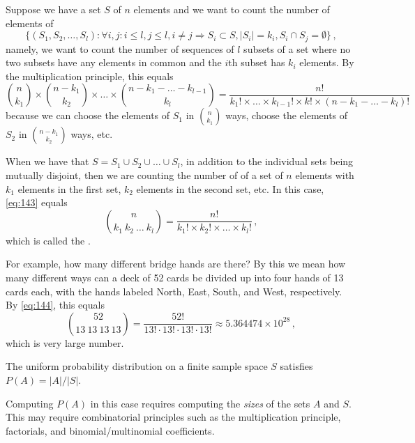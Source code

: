 \begin{example}
    Suppose we have a set $S$ of $n$ elements and we want to count the number of elements of
    \[
    \{(S_1, S_2,\dots,S_l): \forall i,j : i\leqslant l,j\leqslant l, i\neq j \Rightarrow S_i \subset S, |S_i|=k_i, S_i \cap S_j = \emptyset\}\,,
    \]
    namely, we want to count the number of sequences of $l$ subsets of a set where no two subsets have any elements in common and the $i$th subset has $k_i$ elements. By the multiplication principle, this equals
    \begin{equation}
        \label{eq:143}
        \binom{n}{k_1}\times\binom{n-k_1}{k_2}\times\dots\times\binom{n-k_1-\dots-k_{l-1}}{k_l} =        \frac{n!}{k_1!\times\dots\times k_{l-1}!\times k!\times(n-k_1-\dots-k_l)!}
    \end{equation}
    because we can choose the elements of $S_1$ in $\binom{n}{k_1}$ ways, choose the elements of $S_2$ in $\binom{n-k_1}{k_2}$ ways, etc.

    When we have that $S=S_1 \cup S_2 \cup \dots \cup S_l$, in addition to the individual sets being mutually disjoint, then we are counting the number of  of a set of $n$ elements with $k_1$ elements in the first set, $k_2$ elements in the second set, etc. In this case, \autoref{eq:143} equals
    \begin{equation}\label{eq:144}
        \binom{n}{k_1\:k_2\:\dots\:k_l} = \frac{n!}{k_1!\times k_2!\times\dots\times k_l!}\,,
    \end{equation}
    which is called the .
\end{example}

For example, how many different bridge hands are there? By this we mean how many different ways can a deck of 52 cards be divided up into four hands of 13 cards each, with the hands labeled North, East, South, and West, respectively. By  \autoref{eq:144}, this equals
$$
\binom{52}{13\:13\:13\:13} = \frac{52!}{13!\cdot13!\cdot13!\cdot13!} \approx 5.364474 \times 10^{28}\,,
$$
which is very large number.

\begin{summary}
    \item The uniform probability distribution on a finite sample space $S$ satisfies $P(A)=|A|/|S|$.
    \item Computing $P(A)$ in this case requires computing the \emph{sizes} of the sets $A$ and $S$. This may require combinatorial principles such as the multiplication principle, factorials, and binomial/multinomial coefficients.
\end{summary}

